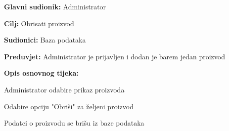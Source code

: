 					\noindent {}
					\begin{packed_item}
						
						\item \textbf{Glavni sudionik:} Administrator
						\item  \textbf{Cilj:} Obrisati proizvod
						\item  \textbf{Sudionici:} Baza podataka
						\item  \textbf{Preduvjet:} Administrator je prijavljen i dodan je barem jedan proizvod
						\item  \textbf{Opis osnovnog tijeka:}
						
						\item[] \begin{packed_enum}
							
							\item Administrator odabire prikaz proizvoda
							\item Odabire opciju "Obriši" za željeni proizvod
							\item Podatci o proizvodu se brišu iz baze podataka
							
						\end{packed_enum}
							
						
					\end{packed_item}
				
